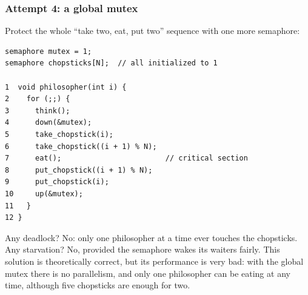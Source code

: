 \subsubsection{Attempt 4: a global mutex}
Protect the whole ``take two, eat, put two'' sequence with one more semaphore:
\begin{lstlisting}
semaphore mutex = 1;
semaphore chopsticks[N];  // all initialized to 1

1  void philosopher(int i) {
2    for (;;) {
3      think();
4      down(&mutex);
5      take_chopstick(i);
6      take_chopstick((i + 1) % N);
7      eat();                        // critical section
8      put_chopstick((i + 1) % N);
9      put_chopstick(i);
10     up(&mutex);
11   }
12 }
\end{lstlisting}
Any deadlock? No: only one philosopher at a time ever touches the chopsticks. Any starvation? No, provided the semaphore wakes its waiters fairly. This solution is theoretically correct, but its performance is very bad: with the global mutex there is no parallelism, and only one philosopher can be eating at any time, although five chopsticks are enough for two.

